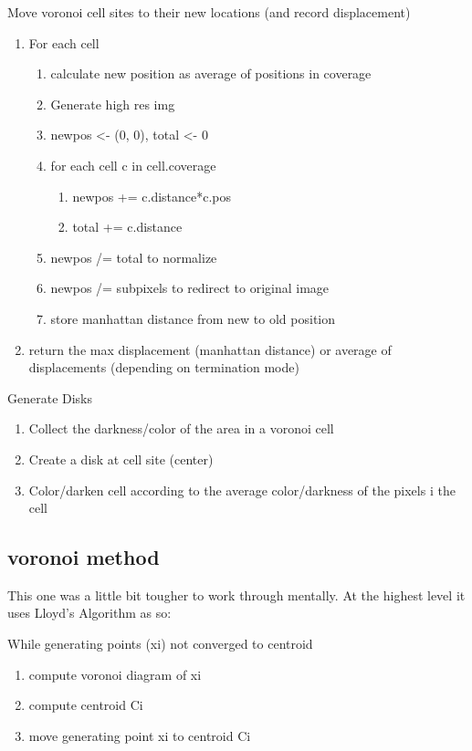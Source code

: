 \documentclass[11pt]{article}
\begin{document}
Move voronoi cell sites to their new locations (and record displacement)
\begin{enumerate}
\item For each cell
\begin{enumerate}
\item calculate new position as average of positions in coverage
\item Generate high res img
\item newpos <- (0, 0), total <- 0
\item for each cell c in cell.coverage
\begin{enumerate}
\item newpos += c.distance*c.pos
\item total += c.distance
\end{enumerate}

\item newpos /= total to normalize
\item newpos /= subpixels to redirect to original image
\item store manhattan distance from new to old position
\end{enumerate}

\item return the max displacement (manhattan distance) or average of displacements (depending on termination mode)
\end{enumerate}


Generate Disks
\begin{enumerate}
\item Collect the darkness/color of the area in a voronoi cell
\item Create a disk at cell site (center)
\item Color/darken cell according to the average color/darkness of the pixels i the cell
\end{enumerate}


\subsection{voronoi method}
This one was a little bit tougher to work through mentally. At the highest level it uses Lloyd's Algorithm as so:

While generating points (xi) not converged to centroid
\begin{enumerate}
\item compute voronoi diagram of xi
\item compute centroid Ci
\item move generating point xi to centroid Ci
\end{enumerate}
\end{document}
